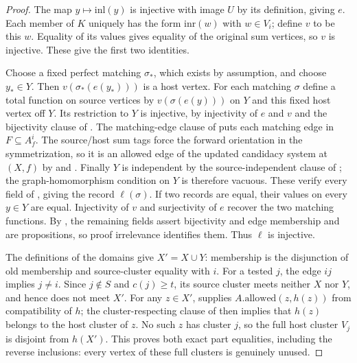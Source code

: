 \begin{proof}
The map $y\mapsto\mathrm{inl}(y)$ is injective with image $U$ by its
definition, giving $e$. Each member of $K$ uniquely has the form
$\mathrm{inr}(w)$ with $w\in V_i$; define $v$ to be this $w$.
Equality of its values gives equality of the original sum vertices,
so $v$ is injective. These give the first two identities.

Choose a fixed perfect matching $\sigma_*$, which exists by assumption,
and choose $y_*\in Y$. Then $v(\sigma_*(e(y_*)))$ is a host vertex.
For each matching $\sigma$ define a total function on source vertices
by $v(\sigma(e(y)))$ on $Y$ and this fixed host vertex off $Y$.
Its restriction to $Y$ is injective, by injectivity of $e$ and $v$
and the bijectivity clause of .
The matching-edge clause of  puts each
matching edge in $F\subseteq A_f^i$.
The source/host sum tags force the forward orientation in the
symmetrization, so it is an allowed edge of the updated candidacy
system at $(X,f)$ by  and
. Finally $Y$ is independent by the source-independent
clause of ; the graph-homomorphism condition on
$Y$ is therefore vacuous. These verify every field of
, giving the record $\ell(\sigma)$.
If two records are equal, their values on every $y\in Y$ are equal.
Injectivity of $v$ and surjectivity of $e$ recover the two matching
functions. By , the remaining fields assert
bijectivity and edge membership and are propositions, so proof
irrelevance identifies them. Thus
$\ell$ is injective.

The definitions of the domains give $X'=X\cup Y$: membership is the
disjunction of old membership and source-cluster equality with $i$.
For a tested $j$, the edge $ij$ implies $j\ne i$.
Since $j\notin S$ and $c(j)\ge t$, its source cluster meets neither
$X$ nor $Y$, and hence does not meet $X'$.
For any $z\in X'$,  supplies
$A.\mathrm{allowed}(z,h(z))$ from compatibility of $h$; the cluster-respecting
clause of  then implies that $h(z)$ belongs to the
host cluster of $z$. No such $z$ has cluster $j$, so the full host
cluster $V_j$ is disjoint from $h(X')$. This proves both exact part
equalities, including the reverse inclusions: every vertex of these
full clusters is genuinely unused.


\end{proof}
